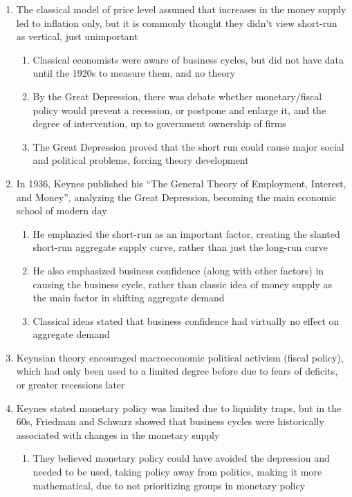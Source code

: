 \begin{enumerate}
\item The classical model of price level assumed that increases in the money supply led to inflation only, but it is commonly thought they didn't view short-run as vertical, just unimportant
\begin{enumerate}
\item Classical economists were aware of business cycles, but did not have data until the 1920s to measure them, and no theory
\item By the Great Depression, there was debate whether monetary/fiscal policy would prevent a recession, or postpone and enlarge it, and the degree of intervention, up to government ownership of firms
\item The Great Depression proved that the short run could cause major social and political problems, forcing theory development
\end{enumerate}
\item In 1936, Keynes published his ``The General Theory of Employment, Interest, and Money'', analyzing the Great Depression, becoming the main economic school of modern day
\begin{enumerate}
\item He emphazied the short-run as an important factor, creating the slanted short-run aggregate supply curve, rather than just the long-run curve
\item He also emphasized business confidence (along with other factors) in causing the business cycle, rather than classic idea of money supply as the main factor in shifting aggregate demand
\item Classical ideas stated that business confidence had virtually no effect on aggregate demand
\end{enumerate}
\item Keynsian theory encouraged macroeconomic political activism (fiscal policy), which had only been used to a limited degree before due to fears of deficits, or greater recessions later
\item Keynes stated monetary policy was limited due to liquidity traps, but in the 60s, Friedman and Schwarz showed that business cycles were historically associated with changes in the monetary supply
\begin{enumerate}
\item They believed monetary policy could have avoided the depression and needed to be used, taking policy away from politics, making it more mathematical, due to not prioritizing groups in monetary policy

\end{enumerate}
\end{enumerate}
